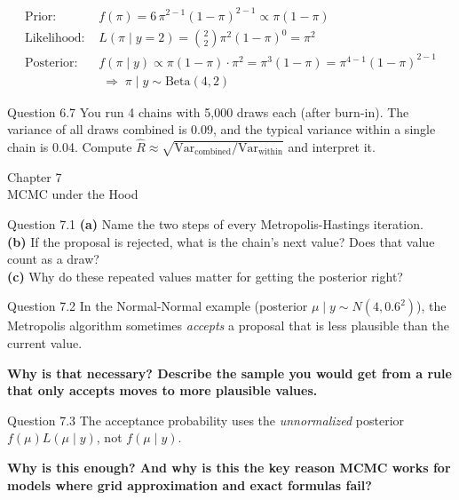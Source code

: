 \documentclass[aspectratio=43,11pt]{beamer}
\newcommand{\divider}[2]{%
  \begin{frame}
    \centering
    {\Large #1}\\[0.6em]
    {\normalsize #2}
  \end{frame}}
\begin{document}
\begin{frame}
\footnotesize 
\begin{align*}
\text{Prior: } & f(\pi) = 6\,\pi^{2-1}(1-\pi)^{2-1} \propto \pi(1-\pi) \\
\text{Likelihood: } & L(\pi \mid y=2) = \binom{2}{2}\pi^{2}(1-\pi)^{0} = \pi^{2} \\
\text{Posterior: } & f(\pi \mid y) \propto \pi(1-\pi)\cdot\pi^{2}
  = \pi^{3}(1-\pi) = \pi^{4-1}(1-\pi)^{2-1}\\
  & \;\Rightarrow\; \pi \mid y \sim \text{Beta}(4,2)
\end{align*}
\end{frame}

\begin{frame}{Question 6.7}
  You run 4 chains with 5{,}000 draws each (after burn-in).
  The variance of all draws combined is 0.09, and the typical
  variance within a single chain is 0.04. Compute
  $\hat R \approx \sqrt{\text{Var}_{\text{combined}} /
  \text{Var}_{\text{within}}}$ and interpret it.
\end{frame}

\divider{Chapter 7}{MCMC under the Hood}

\begin{frame}{Question 7.1}
  \textbf{(a)} Name the two steps of every Metropolis-Hastings iteration.
  \\[0.3em]
  \textbf{(b)} If the proposal is rejected, what is the chain's next
  value? Does that value count as a draw? \\[0.3em]
  \textbf{(c)} Why do these repeated values matter for getting the
  posterior right?
\end{frame}

\begin{frame}{Question 7.2}
  In the Normal-Normal example (posterior $\mu \mid y \sim N(4, 0.6^2)$),
  the Metropolis algorithm sometimes \emph{accepts} a proposal that is
  less plausible than the current value.
  \vspace{0.6em}

  \textbf{Why is that necessary? Describe the sample you would get from a
  rule that only accepts moves to more plausible values.}
\end{frame}

\begin{frame}{Question 7.3}
  The acceptance probability uses the \emph{unnormalized} posterior
  $f(\mu)L(\mu \mid y)$, not $f(\mu \mid y)$.
  \vspace{0.6em}

  \textbf{Why is this enough? And why is this the key reason MCMC works
  for models where grid approximation and exact formulas fail?}
\end{frame}
\end{document}
